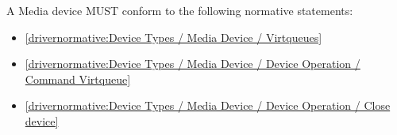\label{sec:Conformance / Driver Conformance / Media Driver Conformance}

A Media device MUST conform to the following normative statements:

\begin{itemize}
\item \ref{drivernormative:Device Types / Media Device / Virtqueues}
\item \ref{drivernormative:Device Types / Media Device / Device Operation / Command Virtqueue}
\item \ref{drivernormative:Device Types / Media Device / Device Operation / Close device}
\end{itemize}